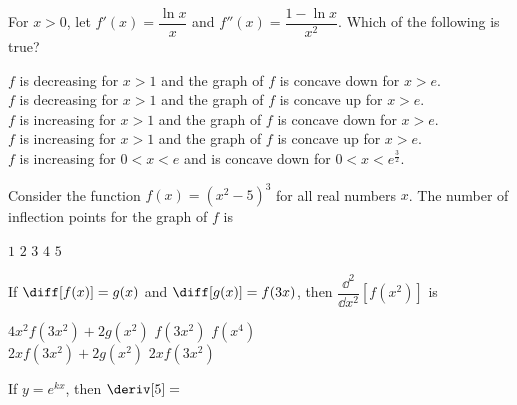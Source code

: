 \begin{questions}
    \question For $x > 0$, let $f'(x) = \dfrac{\ln x}{x}$ and $f''(x) = \dfrac{1 - \ln x}{x^2}$. Which of the following is true? \\

    \begin{oneparchoices}
        \choice $f$ is decreasing for $x > 1$ and the graph of $f$ is concave down for $x > e$. \\[11pt]
        \makebox[0.035\textwidth] \choice $f$ is decreasing for $x > 1$ and the graph of $f$ is concave up for $x > e$. \\[11pt]
        \makebox[0.035\textwidth] \choice $f$ is increasing for $x > 1$ and the graph of $f$ is concave down for $x > e$. \\[11pt]
        \makebox[0.035\textwidth] \choice $f$ is increasing for $x > 1$ and the graph of $f$ is concave up for $x > e$. \\[11pt]
        \makebox[0.035\textwidth] \choice $f$ is increasing for $0 < x < e$ and is concave down for $0 < x < e^{\frac{3}{2}}$.
    \end{oneparchoices} \par \horizontalline

    \question Consider the function $f(x) = \left(x^2 - 5\right)^3$ for all real numbers $x$. The number of inflection points for the graph of $f$ is \\ 

    \begin{oneparchoices}
        \choice $1$
        \choice $2$
        \choice $3$
        \choice $4$
        \choice $5$
    \end{oneparchoices} \par \horizontalline

    \question If $\diff [f(x)] = g(x)$ and $\diff [g(x)] = f(3x)$, then $\dfrac{\dd ^2}{\dd x^2} \left[f\left(x^2\right)\right]$ is \\

    \begin{oneparchoices}
        \choice $4x^2f\left(3x^2\right) + 2g\left(x^2\right)$
        \choice $f\left(3x^2\right)$
        \choice $f\left(x^4\right)$ \\[11pt]
        \makebox[0.19\textwidth] \choice $2xf\left(3x^2\right) + 2g\left(x^2\right)$
        \makebox[0.24\textwidth] \choice $2xf\left(3x^2\right)$
    \end{oneparchoices} \par \horizontalline

    \question If $y = e^{kx}$, then $\deriv[5] = $ \\


\end{questions}
